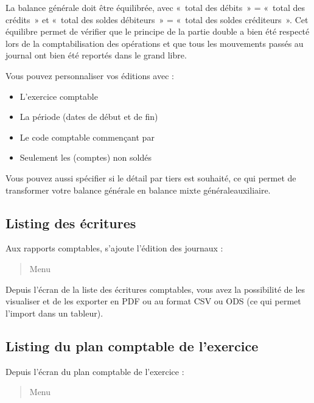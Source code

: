 \documentclass[a4paper,10pt,oneside,french]{sphinxmanual}
\begin{document}
\sphinxAtStartPar
La balance générale doit être équilibrée, avec « total des débits » = « total des crédits » et « total des soldes débiteurs » = « total des soldes créditeurs ». Cet équilibre permet de vérifier que le principe de la partie double a bien été respecté lors de la comptabilisation des opérations et que tous les mouvements passés au journal ont bien été reportés dans le grand libre.

\sphinxAtStartPar
Vous pouvez personnaliser vos éditions avec :
\begin{itemize}
\item {} 
\sphinxAtStartPar
L’exercice comptable

\item {} 
\sphinxAtStartPar
La période (dates de début et de fin)

\item {} 
\sphinxAtStartPar
Le code comptable commençant par

\item {} 
\sphinxAtStartPar
Seulement les (comptes) non soldés

\end{itemize}

\sphinxAtStartPar
Vous pouvez aussi spécifier si le détail par tiers est souhaité, ce qui permet de transformer votre balance générale en balance mixte générale\sphinxhyphen{}auxiliaire.


\subsection{Listing des écritures}
\label{\detokenize{accounting/reporting:listing-des-ecritures}}
\sphinxAtStartPar
Aux rapports comptables, s’ajoute l’édition des journaux :
\begin{quote}

\sphinxAtStartPar
Menu 
\end{quote}

\sphinxAtStartPar
Depuis l’écran de la liste des écritures comptables, vous avez la possibilité de les visualiser et de les exporter en PDF ou au format CSV ou ODS (ce qui permet l’import dans un tableur).


\subsection{Listing du plan comptable de l’exercice}
\label{\detokenize{accounting/reporting:listing-du-plan-comptable-de-l-exercice}}
\sphinxAtStartPar
Depuis l’écran du plan comptable de l’exercice :
\begin{quote}

\sphinxAtStartPar
Menu 
\end{quote}
\end{document}
